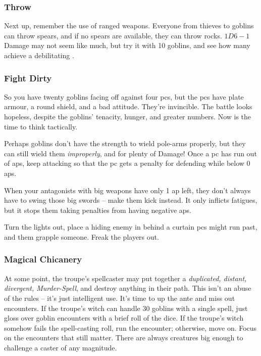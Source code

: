 \begin{multicols}{2}
\subsubsection{Throw}

Next up, remember the use of ranged weapons.
Everyone from thieves to goblins can throw spears, and if no spears are available, they can throw rocks.
$1D6-1$ Damage may not seem like much, but try it with 10 goblins, and see how many achieve a debilitating .

\subsubsection{Fight Dirty}

So you have twenty goblins facing off against four \glspl{pc}, but the \glspl{pc} have plate armour, a round shield, and a bad attitude.
They're invincible.
The battle looks hopeless, despite the goblins' tenacity, hunger, and greater numbers.
Now is the time to think tactically.

Perhaps goblins don't have the strength to wield pole-arms properly, but they can still wield them \emph{improperly}, and for plenty of Damage!
Once a \gls{pc} has run out of \glspl{ap}, keep attacking so that the \gls{pc} gets a penalty for defending while below 0 \glspl{ap}.

When your antagonists with big weapons have only 1 \gls{ap} left, they don't always have to swing those big swords -- make them kick instead.
It only inflicts \glspl{fatigue}, but it stops them taking penalties from having negative \glspl{ap}.

Turn the lights out, place a hiding enemy in behind a curtain \glspl{pc} might run past, and them grapple someone.
Freak the players out.

\subsubsection{Magical Chicanery}

At some point, the troupe's spellcaster may put together a \textit{duplicated, distant, divergent, Murder-Spell}, and destroy anything in their path.
This isn't an abuse of the rules -- it's just intelligent use.
It's time to up the ante and miss out encounters.
If the troupe's witch can handle 30 goblins with a single spell, just gloss over goblin encounters with a brief roll of the dice.
If the troupe's witch somehow fails the spell-casting roll, run the encounter; otherwise, move on.
Focus on the encounters that still matter.
There are always creatures big enough to challenge a caster of any magnitude.


\end{multicols}
